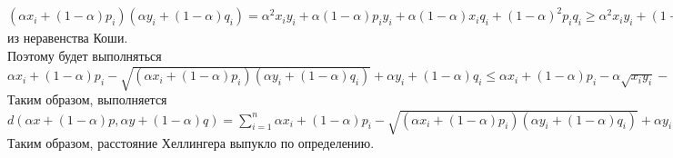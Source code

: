 \documentclass[12pt]{extreport}
\theoremstyle{definiton}
\theoremstyle{definition}
\theoremstyle{definition}
\let\leq\leqslant
\let\geq\geqslant
\def\prend{
	\medskip
}
\begin{document}
\begin{enumerate}
    \\ $(\alpha x_i + (1-\alpha)p_i)(\alpha y_i + (1-\alpha)q_i) = \alpha^2 x_i y_i + \alpha(1-\alpha)p_iy_i + \alpha(1-\alpha)x_iq_i + (1-\alpha)^2p_iq_i \geq \alpha^2x_iy_i + (1-\alpha)^2p_iq_i + 2\alpha(1-\alpha)\sqrt{p_iy_ix_iq_i} = (\alpha \sqrt{x_iy_i} + (1-\alpha)\sqrt{p_iq_i})^2$ из неравенства Коши.
    \\ Поэтому будет выполняться $\alpha x_i + (1-\alpha)p_i - \sqrt{(\alpha x_i + (1-\alpha)p_i)(\alpha y_i + (1-\alpha)q_i)} + \alpha y_i + (1-\alpha)q_i \leq \alpha x_i + (1-\alpha)p_i  - \alpha \sqrt{x_iy_i} - (1-\alpha)\sqrt{p_iq_i} + \alpha y_i + (1-\alpha)q_i = \alpha(x_i - \sqrt{x_iy_i} + y_i) + (1-\alpha)(p_i - \sqrt{p_iq_i} + q_i)$
    \\ Таким образом, выполняется $d(\alpha x + (1-\alpha)p, \alpha y + (1-\alpha)q) = \sum_{i=1}^n \alpha x_i + (1-\alpha)p_i - \sqrt{(\alpha x_i + (1-\alpha)p_i)(\alpha y_i + (1-\alpha)q_i)} + \alpha y_i + (1-\alpha)q_i \leq \sum_{i=1}^n\alpha(x_i - \sqrt{x_iy_i} + y_i) + (1-\alpha)(p_i - \sqrt{p_iq_i} + q_i) = \alpha d(x,y) + (1-\alpha)d(p,q)$
    \\ Таким образом, расстояние Хеллингера выпукло по определению.
    \end{enumerate}
    \prend
\end{document}
